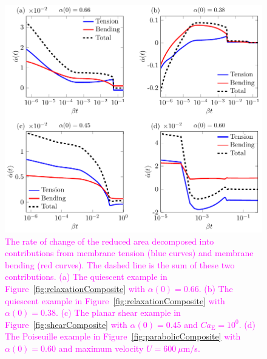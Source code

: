 \documentclass[prb,preprint,showpacs,preprintnumbers,amsmath,amssymb,longbibliography]{revtex4-1}
\newif\ifTikz
\begin{document}
\begin{figure}[htp]
  \ifTikz
  
  \else
  \includegraphics{figures/unconfinedRAdecomp.pdf}
  \fi
  \caption{\label{fig:unconfinedRAdecomp}\textcolor{magenta}{The rate of
  change of the reduced area decomposed into contributions from membrane
  tension (blue curves) and membrane bending (red curves).  The dashed
  line is the sum of these two contributions. (a) The quiescent example
  in Figure~\ref{fig:relaxationComposite} with $\alpha(0) = 0.66$. (b)
  The quiescent example in Figure~\ref{fig:relaxationComposite} with
  $\alpha(0) = 0.38$. (c) The planar shear example in
  Figure~\ref{fig:shearComposite} with $\alpha(0) = 0.45$ and
  $Ca_\mathrm{E} = 10^0$. (d) The Poiseuille example in
  Figure~\ref{fig:parabolicComposite} with $\alpha(0) = 0.60$ and
  maximum velocity $U = 600~\mu$m/s.}}
\end{figure}


\end{document}
